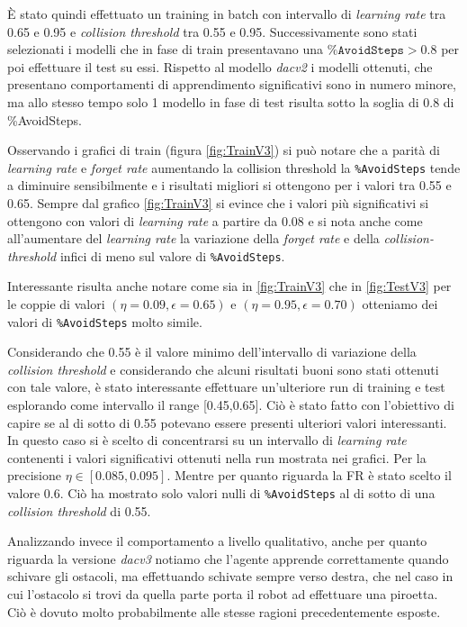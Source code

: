 È stato quindi effettuato un training in batch con intervallo di \textit{learning rate} tra 0.65 e 0.95 e \textit{collision threshold} tra 0.55 e 0.95. Successivamente sono stati selezionati i modelli che in fase di train presentavano una $\texttt{\%AvoidSteps} > 0.8$ per poi effettuare il test su essi.
Rispetto al modello \textit{dacv2} i modelli ottenuti, che presentano comportamenti di apprendimento significativi sono in numero minore, ma allo stesso tempo solo 1 modello in fase di test risulta sotto la soglia di 0.8 di \%AvoidSteps.

Osservando i grafici di train (figura \ref{fig:TrainV3}) si può notare che a parità di \textit{learning rate} e \textit{forget rate} aumentando la collision threshold la \texttt{\%AvoidSteps} tende a diminuire sensibilmente e i risultati migliori si ottengono per i valori tra 0.55 e 0.65. 
Sempre dal grafico \ref{fig:TrainV3} si evince che i valori più significativi si ottengono con valori di \textit{learning rate} a partire da 0.08 e si nota anche come all'aumentare del \textit{learning rate} la variazione della \textit{forget rate} e della \textit{collision-threshold} infici di meno sul valore di \texttt{\%AvoidSteps}.

Interessante risulta anche notare come sia in \ref{fig:TrainV3} che in \ref{fig:TestV3} per le coppie di valori $(\eta=0.09, \epsilon=0.65)$ e $(\eta=0.95, \epsilon=0.70)$ otteniamo dei valori di \texttt{\%AvoidSteps} molto simile.

Considerando che 0.55 è il valore minimo dell'intervallo di variazione della \textit{collision threshold} e considerando che alcuni risultati buoni sono stati ottenuti con tale valore, è stato interessante effettuare un'ulteriore run di training e test esplorando come intervallo il range [0.45,0.65]. Ciò è stato fatto con l'obiettivo di capire se al di sotto di 0.55 potevano essere presenti ulteriori valori interessanti. In questo caso si è scelto di concentrarsi su un intervallo di \textit{learning rate} contenenti i valori significativi ottenuti nella run mostrata nei grafici. Per la precisione $\eta \in [0.085, 0.095]$. Mentre per quanto riguarda la FR è stato scelto il valore 0.6.
Ciò ha mostrato solo valori nulli di \texttt{\%AvoidSteps} al di sotto di una \textit{collision threshold} di 0.55.

Analizzando invece il comportamento a livello qualitativo, anche per quanto riguarda la versione \textit{dacv3} notiamo che l'agente apprende correttamente quando schivare gli ostacoli, ma effettuando schivate sempre verso destra, che nel caso in cui l'ostacolo si trovi da quella parte porta il robot ad effettuare una piroetta. Ciò è dovuto molto probabilmente alle stesse ragioni precedentemente esposte. 

